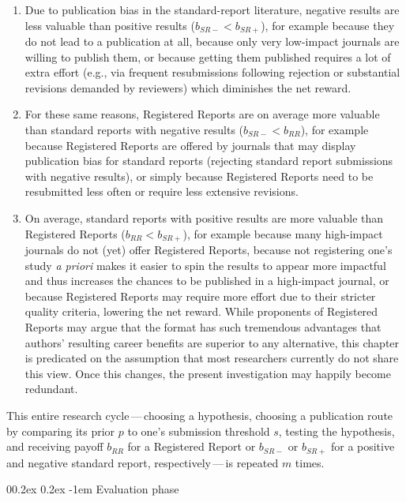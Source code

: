 \documentclass[
  ,man,mask,floatsintext]{apa6}
\makeatletter
\providecommand{\tightlist}{%
  \setlength{\itemsep}{0pt}\setlength{\parskip}{0pt}}
\let\oldparagraph\paragraph
\renewcommand{\paragraph}[1]{\oldparagraph{#1}\mbox{}}
\renewcommand{\paragraph}{\@startsection{paragraph}{4}{\parindent}%
  {0\baselineskip \@plus 0.2ex \@minus 0.2ex}%
  {-1em}%
  {\normalfont\normalsize\bfseries\itshape\typesectitle}}
\makeatother
\begin{document}
\begin{enumerate}
\def\labelenumi{\arabic{enumi}.}
\tightlist
\item
  Due to publication bias in the standard-report literature, negative results are less valuable than positive results (\(b_{SR-} < b_{SR+}\)), for example because they do not lead to a publication at all, because only very low-impact journals are willing to publish them, or because getting them published requires a lot of extra effort (e.g., via frequent resubmissions following rejection or substantial revisions demanded by reviewers) which diminishes the net reward.
\item
  For these same reasons, Registered Reports are on average more valuable than standard reports with negative results (\(b_{SR-} < b_{RR}\)), for example because Registered Reports are offered by journals that may display publication bias for standard reports (rejecting standard report submissions with negative results), or simply because Registered Reports need to be resubmitted less often or require less extensive revisions.
\item
  On average, standard reports with positive results are more valuable than Registered Reports (\(b_{RR} < b_{SR+}\)), for example because many high-impact journals do not (yet) offer Registered Reports, because not registering one's study \emph{a priori} makes it easier to spin the results to appear more impactful and thus increases the chances to be published in a high-impact journal, or because Registered Reports may require more effort due to their stricter quality criteria, lowering the net reward.
  While proponents of Registered Reports may argue that the format has such tremendous advantages that authors' resulting career benefits are superior to any alternative, this chapter is predicated on the assumption that most researchers currently do not share this view.
  Once this changes, the present investigation may happily become redundant.
\end{enumerate}

This entire research cycle\(\,\)---\(\,\)choosing a hypothesis, choosing a publication route by comparing its prior \(p\) to one's submission threshold \(s\), testing the hypothesis, and receiving payoff \(b_{RR}\) for a Registered Report or \(b_{SR-}\) or \(b_{SR+}\) for a positive and negative standard report, respectively\(\,\)---\(\,\)is repeated \(m\) times.

\hypertarget{evaluation-phase}{%
\paragraph{Evaluation phase}\label{evaluation-phase}}
\end{document}
